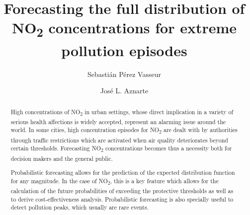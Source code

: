 \documentclass[a4paper,twocolumn,5p]{elsarticle}
\begin{document}
\pagewiselinenumbers

\newcommand{\no}{NO\textsubscript{2}\xspace}

\begin{frontmatter}

  \title{Forecasting the full distribution of \no concentrations for
    extreme pollution episodes}

\author{Sebasti\'an P\'erez Vasseur} 
\address{Artificial Intelligence Department\\Universidad Nacional de
  Educaci\'on a Distancia --- UNED\\c/ Juan del Rosal, 16, Madrid, Spain}

\author{Jos\'e L. Aznarte}
\address{Artificial Intelligence Department\\Universidad Nacional de
  Educaci\'on a Distancia --- UNED\\c/ Juan del Rosal, 16, Madrid, Spain}


\begin{abstract}

  High concentrations of \no in urban settings, whose direct
  implication in a variety of serious health affections is widely
  accepted, represent an alarming issue around the world. In some
  cities, high concentration episodes for \no are dealt with by
  authorities through traffic restrictions which are activated when
  air quality deteriorates beyond certain thresholds. Forecasting \no
  concentrations becomes thus a necessity both for decision makers and
  the general public.

  Probabilistic forecasting %
  allows for the prediction of the expected distribution function for
  any magnitude. In the case of \no, this is a key feature which
  allows for the calculation of the future probabilities of exceeding
  the protective thresholds as well as to derive cost-effectiveness
  analysis. Probabilistic forecasting is also specially useful to
  detect pollution peaks, which usually are rare events.


\end{abstract}
\end{frontmatter}
\end{document}
